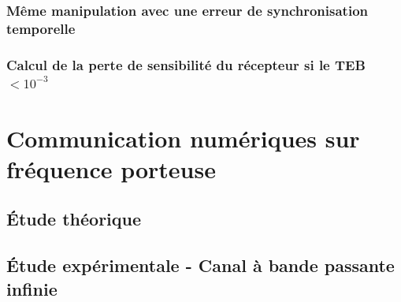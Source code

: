 \documentclass[11pt]{article}
\begin{document}
		\subsubsection{Même manipulation avec une erreur de synchronisation temporelle}
		\subsubsection{Calcul de la perte de sensibilité du récepteur si le TEB $< 10^{-3}$}
		

\section{Communication numériques sur fréquence porteuse}
	\subsection{Étude théorique}
	\subsection{Étude expérimentale - Canal à bande passante infinie}
\end{document}
